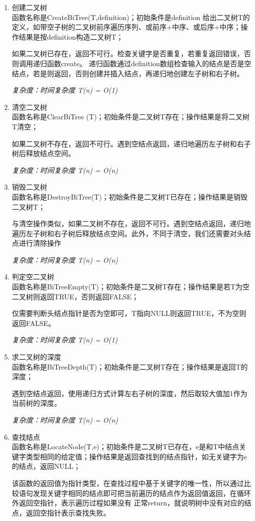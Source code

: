 \documentclass[supercite]{Experimental_Report}
\theoremstyle{definition}
\begin{document}
\begin{enumerate}
	\item 创建二叉树\\
	函数名称是CreateBiTree(T,definition)；初始条件是definition 给出二叉树T的定义，如带空子树的二叉树前序遍历序列、或前序+中序、或后序+中序；操作结果是按definition构造二叉树T；
	
	如果二叉树已存在，返回不可行。检查关键字是否重复，若重复返回错误，否则调用递归函数create。
	递归函数通过definition数组检查输入的结点是否是空结点，若是则返回，否则创建并插入结点，再递归地创建左子树和右子树。
	
	\emph{复杂度：时间复杂度 T(n) = O(1)}
	\item 清空二叉树\\
	函数名称是ClearBiTree (T)；初始条件是二叉树T存在；操作结果是将二叉树T清空；
	
	如果二叉树不存在，返回不可行。遇到空结点返回，递归地遍历左子树和右子树后释放结点空间。
	
	\emph{复杂度：时间复杂度 T(n) = O(n)}
	\item 销毁二叉树\\
	函数名称是DestroyBiTree(T)；初始条件是二叉树T已存在；操作结果是销毁二叉树T；
	
	与清空操作类似，如果二叉树不存在，返回不可行。遇到空结点返回，递归地遍历左子树和右子树后释放结点空间。此外，不同于清空，我们还需要对头结点进行清除操作
	
\emph{复杂度：时间复杂度 T(n) = O(n)}
	\item 判定空二叉树\\
	函数名称是BiTreeEmpty(T)；初始条件是二叉树T存在；操作结果是若T为空二叉树则返回TRUE，否则返回FALSE；
	
	仅需要判断头结点指针是否为空即可，T指向NULL则返回TRUE，不为空则返回FALSE。
	
	\emph{复杂度：时间复杂度 T(n) = O(1)}
	\item 求二叉树的深度\\
	函数名称是BiTreeDepth(T)；初始条件是二叉树T存在；操作结果是返回T的深度；
	
	遇到空结点返回，使用递归方式计算左右子树的深度，然后取较大值加1作为当前树的深度。
	
	\emph{复杂度：时间复杂度 T(n) = O(n)}
	\item 查找结点\\
	函数名称是LocateNode(T,e)；初始条件是二叉树T已存在，e是和T中结点关键字类型相同的给定值；操作结果是返回查找到的结点指针，如无关键字为e的结点，返回NULL；
	
	该函数的返回值为指针类型，在查找过程中基于关键字的唯一性，所以通过比较语句发现关键字相同的结点即可把当前遍历的结点作为返回值返回，在循环外返回空指针，表示遍历过程如果没有
	正常return，就说明树中没有对应的结点，返回空指针表示查找失败。
	

\end{enumerate}
\end{document}
